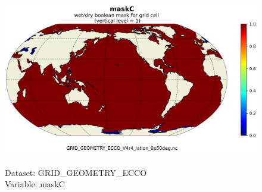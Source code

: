 \begin{figure}[H]
\centering
\includegraphics[scale=0.5]{../images/plots/latlon_plots_coords/Geometry_Parameters_for_the_0.5_degree_Lat-Lon_Model_Grid_(Version_4_Release_4)/maskC.png}
\caption{\\Dataset: GRID\_GEOMETRY\_ECCO\\Variable: maskC}
\label{tab:table-GRID_GEOMETRY_ECCO_maskC-Plot}
\end{figure}
